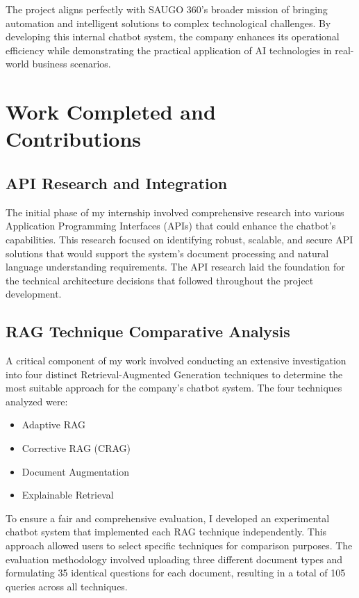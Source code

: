 \documentclass[12pt,a4paper]{article}
\begin{document}
The project aligns perfectly with SAUGO 360's broader mission of bringing automation and intelligent solutions to complex technological challenges. By developing this internal chatbot system, the company enhances its operational efficiency while demonstrating the practical application of AI technologies in real-world business scenarios.

\section{Work Completed and Contributions}

\subsection{API Research and Integration}

The initial phase of my internship involved comprehensive research into various Application Programming Interfaces (APIs) that could enhance the chatbot's capabilities. This research focused on identifying robust, scalable, and secure API solutions that would support the system's document processing and natural language understanding requirements. The API research laid the foundation for the technical architecture decisions that followed throughout the project development.

\subsection{RAG Technique Comparative Analysis}

A critical component of my work involved conducting an extensive investigation into four distinct Retrieval-Augmented Generation techniques to determine the most suitable approach for the company's chatbot system. The four techniques analyzed were:

\begin{itemize}
    \item Adaptive RAG
    \item Corrective RAG (CRAG)
    \item Document Augmentation
    \item Explainable Retrieval
\end{itemize}

To ensure a fair and comprehensive evaluation, I developed an experimental chatbot system that implemented each RAG technique independently. This approach allowed users to select specific techniques for comparison purposes. The evaluation methodology involved uploading three different document types and formulating 35 identical questions for each document, resulting in a total of 105 queries across all techniques.
\end{document}
